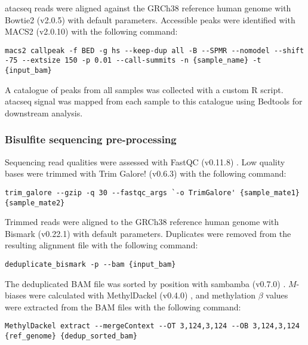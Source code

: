 \Gls{atacseq} reads were aligned against the GRCh38 reference human genome with Bowtie2 (v2.0.5) \cite{langmeadFastGappedreadAlignment2012} with default parameters.
Accessible peaks were identified with MACS2 (v2.0.10) \cite{zhangModelbasedAnalysisChIPSeq2008} with the following command:

\begin{lstlisting}[basicstyle=\ttfamily]
  macs2 callpeak -f BED -g hs --keep-dup all -B --SPMR --nomodel --shift -75 --extsize 150 -p 0.01 --call-summits -n {sample_name} -t {input_bam}
\end{lstlisting}

A catalogue of peaks from all samples was collected with a custom R script.
\Gls{atacseq} signal was mapped from each sample to this catalogue using Bedtools \cite{quinlanBEDToolsSwissArmyTool2014} for downstream analysis.

\subsubsection{Bisulfite sequencing pre-processing}

Sequencing read qualities were assessed with FastQC (v0.11.8) \cite{simonandrewsFastQCQualityControl2010}.
Low quality bases were trimmed with Trim Galore! (v0.6.3) \cite{felixkruegerTrimGalore2012} with the following command:

\begin{lstlisting}[basicstyle=\ttfamily]
  trim_galore --gzip -q 30 --fastqc_args `-o TrimGalore' {sample_mate1} {sample_mate2}
\end{lstlisting}

Trimmed reads were aligned to the GRCh38 reference human genome with Bismark (v0.22.1) \cite{kruegerDNAMethylomeAnalysis2012} with default parameters.
Duplicates were removed from the resulting alignment file with the following command:

\begin{lstlisting}[basicstyle=\ttfamily]
  deduplicate_bismark -p --bam {input_bam}
\end{lstlisting}

The deduplicated BAM file was sorted by position with sambamba (v0.7.0) \cite{tarasovSambambaFastProcessing2015}.
$M$-biases were calculated with MethylDackel (v0.4.0) \cite{ryanMethylDackel2019}, and methylation $\beta$ values were extracted from the BAM files with the following command:

\begin{lstlisting}[basicstyle=\ttfamily]
  MethylDackel extract --mergeContext --OT 3,124,3,124 --OB 3,124,3,124 {ref_genome} {dedup_sorted_bam}
\end{lstlisting}

